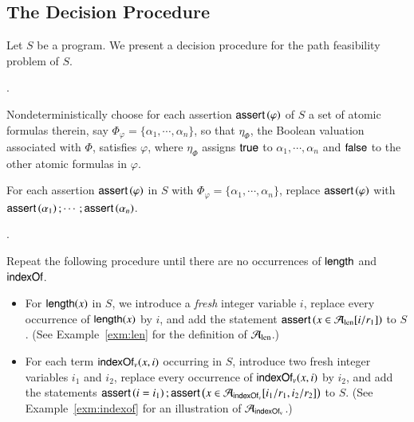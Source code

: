 \subsection{The Decision Procedure}
%
Let $S$  be a {\slint} program. %
We present a decision procedure for the path feasibility problem of $S$. %
%


\medskip
{}.

\smallskip

Nondeterministically choose for each assertion $\textsf{assert}\left(\varphi\right)$ of $S$ a set of atomic formulas therein, say $\Phi_\varphi = \{\alpha_1,\cdots,\alpha_n\}$, so that $\eta_{\Phi}$, the Boolean valuation associated with $\Phi$, satisfies $\varphi$, where $\eta_{\Phi}$ assigns ${\sf true}$ to $\alpha_1,\cdots, \alpha_n$ and ${\sf false}$ to the other atomic formulas in $\varphi$. 

For each assertion $\textsf{assert}\left(\varphi\right)$ in $S$ with $\Phi_\varphi = \{\alpha_1,\cdots,\alpha_n\}$, replace $\textsf{assert}\left(\varphi\right)$ with $\textsf{assert}\left(\alpha_1\right); \cdots; \textsf{assert}\left(\alpha_n\right)$.

\medskip
{}.

\smallskip

Repeat the following procedure until there are no occurrences of $\mathsf{length}$ and $\mathsf{indexOf}$.
\begin{itemize}
\item For  $\mathsf{length}(x)$ in $S$, we introduce a \emph{fresh} integer variable $i$, replace every occurrence of $\mathsf{length}(x)$ by $i$, and add the statement $\textsf{assert}\left(x \in \mathcal{A}_{\rm len}[i/r_1]\right)$ to $S$. (See Example~\ref{exm:len} for the definition of $\mathcal{A}_{\rm len}$.)  
%
\item 
For each term $\mathsf{indexOf}_v(x, i)$ occurring in $S$, introduce two fresh integer variables $i_1$ and $i_2$, replace every occurrence of $\mathsf{indexOf}_v(x, i)$ by $i_2$, and add the statements $\textsf{assert}\left(i=i_1\right); \textsf{assert}\left(x \in \mathcal{A}_{\mathsf{indexOf}_v}[i_1/r_1, i_2/r_2]\right)$ to $S$.  (See Example~\ref{exm:indexof} for an illustration of $\mathcal{A}_{\rm \mathsf{indexOf}_v}$.)
\end{itemize}
%

